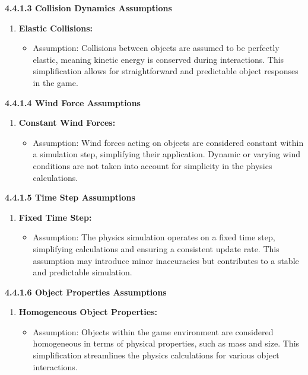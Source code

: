 \documentclass[
]{article}
\begin{document}
\textbf{4.4.1.3 Collision Dynamics Assumptions}

\begin{enumerate}
\def\labelenumi{\arabic{enumi}.}
\setcounter{enumi}{2}
\item
  \textbf{Elastic Collisions:}

  \begin{itemize}
  \item
    Assumption: Collisions between objects are assumed to be perfectly
    elastic, meaning kinetic energy is conserved during interactions.
    This simplification allows for straightforward and predictable
    object responses in the game.
  \end{itemize}
\end{enumerate}

\textbf{4.4.1.4 Wind Force Assumptions}

\begin{enumerate}
\def\labelenumi{\arabic{enumi}.}
\setcounter{enumi}{3}
\item
  \textbf{Constant Wind Forces:}

  \begin{itemize}
  \item
    Assumption: Wind forces acting on objects are considered constant
    within a simulation step, simplifying their application. Dynamic or
    varying wind conditions are not taken into account for simplicity in
    the physics calculations.
  \end{itemize}
\end{enumerate}

\textbf{4.4.1.5 Time Step Assumptions}

\begin{enumerate}
\def\labelenumi{\arabic{enumi}.}
\setcounter{enumi}{4}
\item
  \textbf{Fixed Time Step:}

  \begin{itemize}
  \item
    Assumption: The physics simulation operates on a fixed time step,
    simplifying calculations and ensuring a consistent update rate. This
    assumption may introduce minor inaccuracies but contributes to a
    stable and predictable simulation.
  \end{itemize}
\end{enumerate}

\textbf{4.4.1.6 Object Properties Assumptions}

\begin{enumerate}
\def\labelenumi{\arabic{enumi}.}
\setcounter{enumi}{5}
\item
  \textbf{Homogeneous Object Properties:}

  \begin{itemize}
  \item
    Assumption: Objects within the game environment are considered
    homogeneous in terms of physical properties, such as mass and size.
    This simplification streamlines the physics calculations for various
    object interactions.
  \end{itemize}
\end{enumerate}
\end{document}
